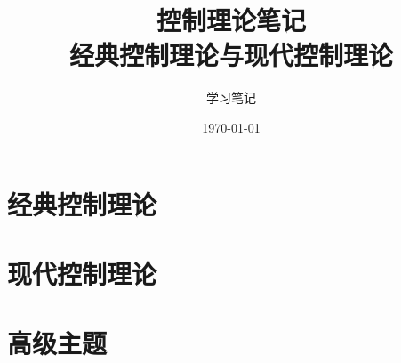 \documentclass[12pt,a4paper]{article}
\title{\textbf{控制理论笔记}\\[0.5em]\large 经典控制理论与现代控制理论}
\author{学习笔记}
\date{\today}
\begin{document}
\maketitle
\tableofcontents
\newpage

\part{经典控制理论}























\part{现代控制理论}















\part{高级主题}



\end{document}
